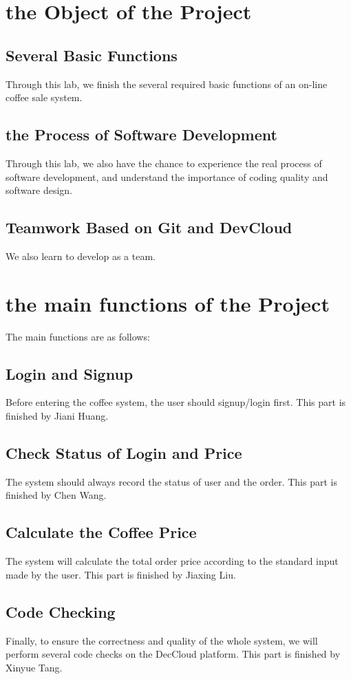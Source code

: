 \documentclass[./report.tex]{subfiles}
\begin{document}
\section{the Object of the Project}
\subsection{Several Basic Functions}
Through this lab, we finish the several required basic functions of an on-line coffee sale system.
\subsection{the Process of Software Development}
Through this lab, we also have the chance to experience the real process of software development, and understand the importance of coding quality and software design.
\subsection{Teamwork Based on Git and DevCloud}
We also learn to develop as a team.

\section{the main functions of the Project}
 The main functions are as follows:
 \subsection{Login and Signup}
 Before entering the coffee system, the user should signup/login first. This part is finished by Jiani Huang. 
 \subsection{Check Status of Login and Price}
 The system should always record the status of user and the order. This part is finished by Chen Wang.
 \subsection{Calculate the Coffee Price}
 The system will calculate the total order price according to the standard input made by the user. This part is finished by Jiaxing Liu.
  \subsection{Code Checking}
  Finally, to ensure the correctness and quality of the whole system, we will perform several code checks on the DecCloud platform. This part is finished by Xinyue Tang.
\end{document}
